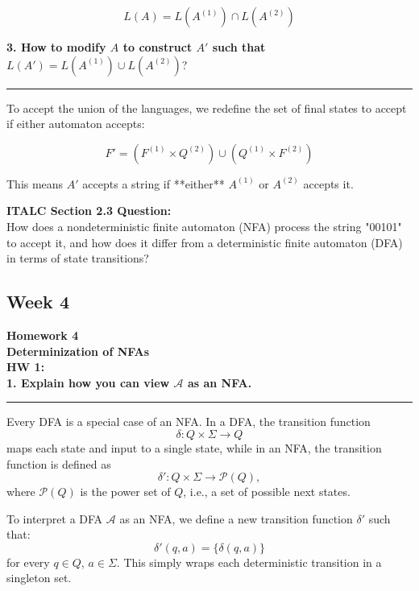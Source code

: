 \documentclass{article}
\theoremstyle{theorem}
\theoremstyle{definition}
\theoremstyle{remark}
\begin{document}
\[
L(A) = L(A^{(1)}) \cap L(A^{(2)})
\]

\vspace{1em}
\textbf{3. How to modify \( A \) to construct \( A' \) such that } \( L(A') = L(A^{(1)}) \cup L(A^{(2)}) \)?

\vspace{0.5em}
\hrule
\vspace{0.5em}

To accept the union of the languages, we redefine the set of final states to accept if either automaton accepts:

\[
F' = (F^{(1)} \times Q^{(2)}) \cup (Q^{(1)} \times F^{(2)})
\]

This means \( A' \) accepts a string if **either** \( A^{(1)} \) or \( A^{(2)} \) accepts it.

\vspace{0.5em}

\textbf{ITALC Section 2.3 Question:}\\
How does a nondeterministic finite automaton (NFA) process the string "00101" to accept it, and how does it differ from a deterministic finite automaton (DFA) in terms of state transitions?


\subsection{Week 4}
\textbf{Homework 4} \\
\textbf{Determinization of NFAs} \\

\textbf{HW 1:} \\
\textbf{1. Explain how you can view \( \mathcal{A} \) as an NFA.}

\vspace{0.5em}
\hrule
\vspace{0.5em}

Every DFA is a special case of an NFA. In a DFA, the transition function  
\[
\delta : Q \times \Sigma \to Q
\]  
maps each state and input to a single state, while in an NFA, the transition function is defined as  
\[
\delta' : Q \times \Sigma \to \mathcal{P}(Q),
\]  
where \( \mathcal{P}(Q) \) is the power set of \( Q \), i.e., a set of possible next states.

To interpret a DFA \( \mathcal{A} \) as an NFA, we define a new transition function \( \delta' \) such that:
\[
\delta'(q, a) = \{ \delta(q, a) \}
\]
for every \( q \in Q \), \( a \in \Sigma \). This simply wraps each deterministic transition in a singleton set.
\end{document}
